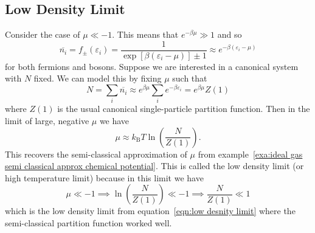 \documentclass[a4paper]{article}
\newcommand{\boltzmann}{k_\mathrm{B}}
\newcommand{\mean}[1]{\overline{#1}}
\begin{document}
    \subsection{Low Density Limit}
    Consider the case of \(\mu \ll -1\).
    This means that \(e^{-\beta\mu} \gg 1\) and so
    \[\mean{n_{i}} = f_{\pm}(\varepsilon_{i}) = \frac{1}{\exp[\beta(\varepsilon_i - \mu)] \pm 1} \approx e^{-\beta(\varepsilon_i - \mu)}\]
    for both fermions and bosons.
    Suppose we are interested in a canonical system with \(N\) fixed.
    We can model this by fixing \(\mu\) such that
    \[N = \sum_i \mean{n_i} \approx e^{\beta \mu}\sum_i e^{-\beta \varepsilon_i} = e^{\beta \mu}Z(1)\]
    where \(Z(1)\) is the usual canonical single-particle partition function.
    Then in the limit of large, negative \(\mu\) we have
    \[\mu \approx \boltzmann T\ln\left( \frac{N}{Z(1)} \right).\]
    This recovers the semi-classical approximation of \(\mu\) from example~\ref{exa:ideal gas semi classical approx chemical potential}.
    This is called the low density limit (or high temperature limit) because in this limit we have
    \[\mu \ll -1 \implies \ln\left( \frac{N}{Z(1)} \right) \ll -1 \implies \frac{N}{Z(1)} \ll 1\]
    which is the low density limit from equation~\ref{eqn:low desnity limit} where the semi-classical partition function worked well.
    
\end{document}
